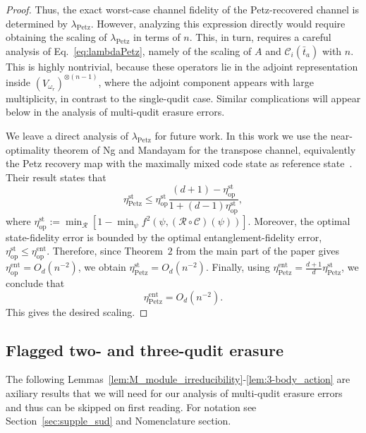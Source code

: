 \documentclass[11pt,letterpaper]{article}
\theoremstyle{plain}
\theoremstyle{plain}
\theoremstyle{plain}
\theoremstyle{plain}
\theoremstyle{plain}
\theoremstyle{plain}
\theoremstyle{plain}
\theoremstyle{definition}
\theoremstyle{plain}
\begin{document}
\begin{proof}
Thus, the exact worst-case channel fidelity of the Petz-recovered channel is determined by \(\lambda_{\mathrm{Petz}}\). 
However, analyzing this expression directly would require obtaining the scaling of \(\lambda_{\mathrm{Petz}}\) in terms of \(n\). 
This, in turn, requires a careful analysis of Eq.~\eqref{eq:lambdaPetz}, namely of the scaling of \(A\) and \(\mathcal C_i(\bar t_a)\) with \(n\). 
This is highly nontrivial, because these operators lie in the adjoint representation inside \((V_{\omega_r})^{\otimes(n-1)}\), 
where the adjoint component appears with large multiplicity, in contrast to the single-qudit case. 
Similar complications will appear below in the analysis of multi-qudit erasure errors.

We leave a direct analysis of \(\lambda_{\mathrm{Petz}}\) for future work. In this work we use the near-optimality theorem of Ng and Mandayam for the transpose channel, 
equivalently the Petz recovery map with the maximally mixed code state as reference state~\cite{Ng2010}. Their result states that
\[
\eta_{\mathrm{Petz}}^{\mathrm{st}}
\le
\eta_{\mathrm{op}}^{\mathrm{st}}
\frac{(d+1)-\eta_{\mathrm{op}}^{\mathrm{st}}}
{1+(d-1)\eta_{\mathrm{op}}^{\mathrm{st}}},
\]
where \(\eta_{\mathrm{op}}^{\mathrm{st}}:=\min_{\mathcal R}[1-\min_{\psi}f^2(\psi,(\mathcal R\circ\mathcal C)(\psi))]\). 
Moreover, the optimal state-fidelity error is bounded by the optimal entanglement-fidelity error, \(\eta_{\mathrm{op}}^{\mathrm{st}}\leq \eta_{\mathrm{op}}^{\mathrm{ent}}\). 
Therefore, since Theorem~$2$ from the main part of the paper gives \(\eta_{\mathrm{op}}^{\mathrm{ent}}=O_{d}(n^{-2})\), we obtain \(\eta_{\mathrm{Petz}}^{\mathrm{st}}=O_{d}(n^{-2})\). 
Finally, using \(\eta_{\mathrm{Petz}}^{\mathrm{ent}}=\frac{d+1}{d}\eta_{\mathrm{Petz}}^{\mathrm{st}}\), we conclude that
\[
\eta_{\mathrm{Petz}}^{\mathrm{ent}}=O_{d}(n^{-2}).
\]
This gives the desired scaling.

\end{proof}

\subsection{Flagged two- and three-qudit erasure}\label{subsec:supple_multi_erasure_noise}

The following Lemmas~\ref{lem:M_module_irreducibility}-\ref{lem:3-body_action} are axiliary results that we will need for our analysis of multi-qudit 
erasure errors and thus can be skipped on first reading.
For notation see Section~\ref{sec:supple_sud} and Nomenclature section.
\end{document}
